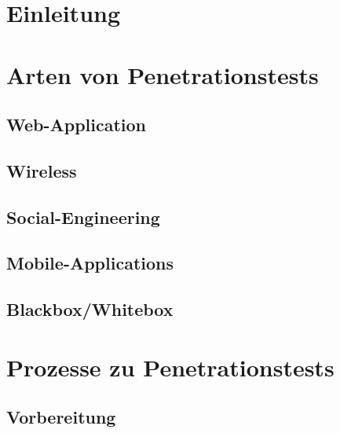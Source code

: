 \documentclass[11pt,DIV=11,twoside, openright, BCOR=3mm]{scrreprt} %
\begin{document}
			
						
				\cleardoublepage

			
				\cleardoublepage	
					
			\setcounter{tocdepth}{4}
			\tableofcontents
				\cleardoublepage	
		
			
			\setcounter{page}{1}            
            \cleardoublepage
            
            
            \chapter{Einleitung}
            \chapter{Arten von Penetrationstests}
	            \section{Web-Application}
	            \section{Wireless}
	            \section{Social-Engineering}
	            \section{Mobile-Applications}
	            \section{Blackbox/Whitebox}
            \chapter{Prozesse zu Penetrationstests}
	            \section{Vorbereitung}
\end{document}
